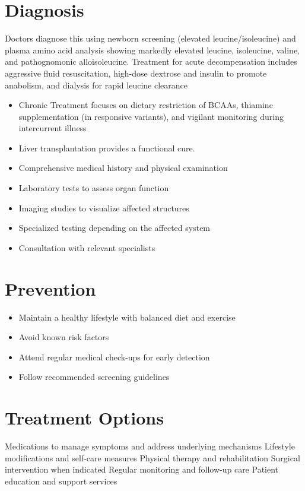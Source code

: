 \section{Diagnosis}
Doctors diagnose this using newborn screening (elevated leucine/isoleucine) and plasma amino acid analysis showing markedly elevated leucine, isoleucine, valine, and pathognomonic alloisoleucine. Treatment for acute decompensation includes aggressive fluid resuscitation, high-dose dextrose and insulin to promote anabolism, and dialysis for rapid leucine clearance

\begin{itemize}[noitemsep]
  \item Chronic Treatment focuses on dietary restriction of BCAAs, thiamine supplementation (in responsive variants), and vigilant monitoring during intercurrent illness
  \item Liver transplantation provides a functional cure.
  \item Comprehensive medical history and physical examination
  \item Laboratory tests to assess organ function
  \item Imaging studies to visualize affected structures
  \item Specialized testing depending on the affected system
  \item Consultation with relevant specialists
\end{itemize}
\section{Prevention}
\begin{itemize}[noitemsep]
  \item Maintain a healthy lifestyle with balanced diet and exercise
  \item Avoid known risk factors
  \item Attend regular medical check-ups for early detection
  \item Follow recommended screening guidelines
\end{itemize}
\section{Treatment Options}
Medications to manage symptoms and address underlying mechanisms Lifestyle modifications and self-care measures Physical therapy and rehabilitation Surgical intervention when indicated Regular monitoring and follow-up care Patient education and support services

